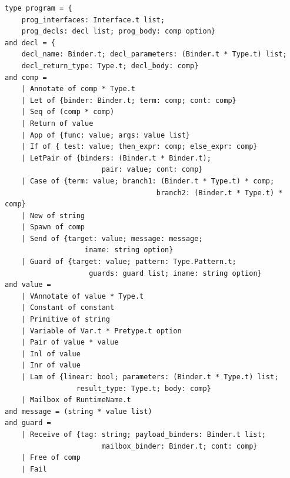 \documentclass{l4proj}
\begin{document}

\noindent\begin{minipage}{\linewidth}
\lstset{style=Ocamlstyle}
\begin{lstlisting}[caption={AST in Pat}, label={lst:framework}]
type program = {
    prog_interfaces: Interface.t list;
    prog_decls: decl list; prog_body: comp option}
and decl = {
    decl_name: Binder.t; decl_parameters: (Binder.t * Type.t) list;
    decl_return_type: Type.t; decl_body: comp}
and comp =
    | Annotate of comp * Type.t
    | Let of {binder: Binder.t; term: comp; cont: comp}
    | Seq of (comp * comp)
    | Return of value
    | App of {func: value; args: value list}
    | If of { test: value; then_expr: comp; else_expr: comp}
    | LetPair of {binders: (Binder.t * Binder.t); 
                       pair: value; cont: comp}
    | Case of {term: value; branch1: (Binder.t * Type.t) * comp; 
                                    branch2: (Binder.t * Type.t) * comp}
    | New of string
    | Spawn of comp
    | Send of {target: value; message: message; 
                   iname: string option}
    | Guard of {target: value; pattern: Type.Pattern.t;
                    guards: guard list; iname: string option}
and value =
    | VAnnotate of value * Type.t
    | Constant of constant
    | Primitive of string
    | Variable of Var.t * Pretype.t option
    | Pair of value * value
    | Inl of value
    | Inr of value
    | Lam of {linear: bool; parameters: (Binder.t * Type.t) list;
                 result_type: Type.t; body: comp}
    | Mailbox of RuntimeName.t
and message = (string * value list)
and guard =
    | Receive of {tag: string; payload_binders: Binder.t list;
                       mailbox_binder: Binder.t; cont: comp}
    | Free of comp
    | Fail

\end{lstlisting}
\end{minipage}
\end{document}
